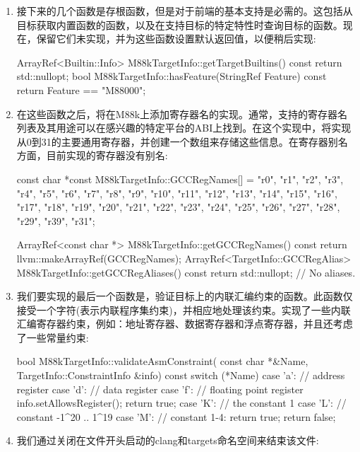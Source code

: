 \begin{enumerate}
\item
接下来的几个函数是存根函数，但是对于前端的基本支持是必需的。这包括从目标获取内置函数的函数，以及在支持目标的特定特性时查询目标的函数。现在，保留它们未实现，并为这些函数设置默认返回值，以便稍后实现:

\begin{cpp}
ArrayRef<Builtin::Info> M88kTargetInfo::getTargetBuiltins()
const {
    return std::nullopt;
}
bool M88kTargetInfo::hasFeature(StringRef Feature) const {
    return Feature == "M88000";
}
\end{cpp}

\item
在这些函数之后，将在M88k上添加寄存器名的实现。通常，支持的寄存器名列表及其用途可以在感兴趣的特定平台的ABI上找到。在这个实现中，将实现从0到31的主要通用寄存器，并创建一个数组来存储这些信息。在寄存器别名方面，目前实现的寄存器没有别名:

\begin{cpp}
const char *const M88kTargetInfo::GCCRegNames[] = {
    "r0", "r1", "r2", "r3", "r4", "r5", "r6", "r7",
    "r8", "r9", "r10", "r11", "r12", "r13", "r14", "r15",
    "r16", "r17", "r18", "r19", "r20", "r21", "r22", "r23",
    "r24", "r25", "r26", "r27", "r28", "r29", "r39", "r31"};

ArrayRef<const char *> M88kTargetInfo::getGCCRegNames() const {
    return llvm::makeArrayRef(GCCRegNames);
}
ArrayRef<TargetInfo::GCCRegAlias>
M88kTargetInfo::getGCCRegAliases() const {
    return std::nullopt; // No aliases.
}
\end{cpp}

\item
我们要实现的最后一个函数是，验证目标上的内联汇编约束的函数。此函数仅接受一个字符(表示内联程序集约束)，并相应地处理该约束。实现了一些内联汇编寄存器约束，例如：地址寄存器、数据寄存器和浮点寄存器，并且还考虑了一些常量约束:

\begin{cpp}
bool M88kTargetInfo::validateAsmConstraint(
const char *&Name, TargetInfo::ConstraintInfo &info) const {
    switch (*Name) {
    case 'a': // address register
    case 'd': // data register
    case 'f': // floating point register
        info.setAllowsRegister();
        return true;
    case 'K': // the constant 1
    case 'L': // constant -1^20 .. 1^19
    case 'M': // constant 1-4:
        return true;
    }
    return false;
}
\end{cpp}

\item
我们通过关闭在文件开头启动的clang和targets命名空间来结束该文件:

\begin{cpp}
} // namespace targets
} // namespace clang
\end{cpp}

\end{enumerate}

